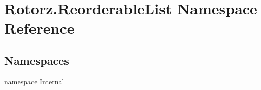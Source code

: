 \hypertarget{namespace_rotorz_1_1_reorderable_list}{}\section{Rotorz.\+Reorderable\+List Namespace Reference}
\label{namespace_rotorz_1_1_reorderable_list}
\subsection*{Namespaces}
\begin{DoxyCompactItemize}
\item 
namespace \hyperlink{namespace_rotorz_1_1_reorderable_list_1_1_internal}{Internal}
\end{DoxyCompactItemize}
